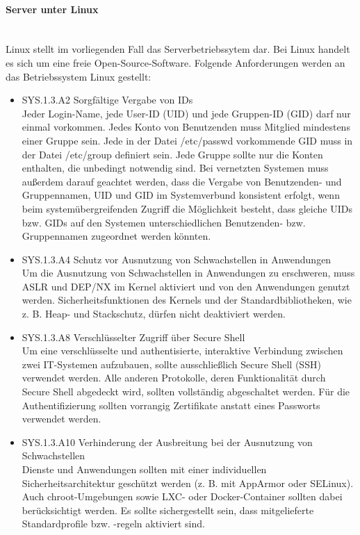 \paragraph{Server unter Linux}
\noindent \\Linux stellt im vorliegenden Fall das Serverbetriebssytem dar. Bei Linux handelt es sich um eine freie Open-Source-Software. Folgende Anforderungen werden an das Betriebssystem Linux gestellt:

\begin{itemize}
	\item	SYS.1.3.A2 Sorgf\"altige Vergabe von IDs\\ 
	Jeder Login-Name, jede User-ID (UID) und jede Gruppen-ID (GID) darf nur einmal vorkommen. Jedes Konto von Benutzenden muss Mitglied mindestens einer Gruppe sein. Jede in der Datei /etc/passwd vorkommende GID muss in der Datei /etc/group definiert sein. Jede Gruppe sollte nur die Konten enthalten, die unbedingt notwendig sind. Bei vernetzten Systemen muss au{\ss}erdem darauf geachtet werden, dass die Vergabe von Benutzenden- und Gruppennamen, UID und GID im Systemverbund konsistent erfolgt, wenn beim system\"ubergreifenden Zugriff die M\"oglichkeit besteht, dass gleiche UIDs bzw. GIDs auf den Systemen unterschiedlichen Benutzenden- bzw. Gruppennamen zugeordnet werden k\"onnten.\cite{Grundschutz}\\
	
	\item SYS.1.3.A4 Schutz vor Ausnutzung von Schwachstellen in Anwendungen\\
	Um die Ausnutzung von Schwachstellen in Anwendungen zu erschweren, muss ASLR und DEP/NX im Kernel aktiviert und von den Anwendungen genutzt werden. Sicherheitsfunktionen des Kernels und der Standardbibliotheken, wie z. B. Heap- und Stackschutz, d\"urfen nicht deaktiviert werden.\cite{Grundschutz}\\
	
	\item SYS.1.3.A8 Verschl\"usselter Zugriff \"uber Secure Shell\\
	Um eine verschl\"usselte und authentisierte, interaktive Verbindung zwischen zwei IT-Systemen aufzubauen, sollte ausschlie{\ss}lich Secure Shell (SSH) verwendet werden. Alle anderen Protokolle, deren Funktionalit\"at durch Secure Shell abgedeckt wird, sollten vollst\"andig abgeschaltet werden. F\"ur die Authentifizierung sollten vorrangig Zertifikate anstatt eines Passworts verwendet werden.\cite{Grundschutz}\\

	\item SYS.1.3.A10 Verhinderung der Ausbreitung bei der Ausnutzung von Schwachstellen\\
	Dienste und Anwendungen sollten mit einer individuellen Sicherheitsarchitektur gesch\"utzt werden (z. B. mit AppArmor oder SELinux). Auch chroot-Umgebungen sowie LXC- oder Docker-Container sollten dabei ber\"ucksichtigt werden. Es sollte sichergestellt sein, dass mitgelieferte Standardprofile bzw. -regeln aktiviert sind.\cite{Grundschutz}\\
\end{itemize}
 

